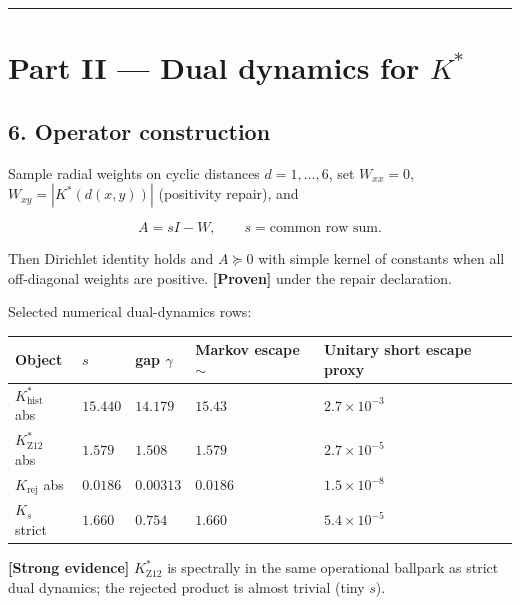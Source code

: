 \documentclass[11pt,a4paper,openany]{report}
\newcommand{\statusProven}{\textcolor{fingreen}{[Proven]}}
\newcommand{\statusStrong}{\textcolor{finblue}{[Strong evidence]}}
\begin{document}
\par\medskip\hrule\medskip

\chapter{\texorpdfstring{Part II — Dual dynamics for \(K^*\)}{Part II — Dual dynamics for K\textasciicircum{}*}}

\section{6. Operator construction}

Sample radial weights on cyclic distances \(d=1,\ldots,6\), set \(W_{xx}=0\), \(W_{xy}=|K^*(d(x,y))|\) (positivity repair), and

\[
A=sI-W,\qquad s=\text{common row sum}.
\]

Then Dirichlet identity holds and \(A\succeq 0\) with simple kernel of constants when all off-diagonal weights are positive. \textbf{\statusProven{}} under the repair declaration.

Selected numerical dual-dynamics rows:

\begin{center}
\begingroup\footnotesize
\setlength{\tabcolsep}{3.5pt}
\renewcommand{\arraystretch}{1.16}
\begin{longtable}{@{}p{}p{}p{}p{}p{}@{}}
\toprule
\textbf{Object} & \textbf{\(s\)} & \textbf{gap \(\gamma\)} & \textbf{Markov escape \(\sim\)} & \textbf{Unitary short escape proxy} \\
\midrule
\endhead
\(K^*_{\mathrm{hist}}\) abs & \(15.440\) & \(14.179\) & \(15.43\) & \(2.7\times10^{-3}\) \\
\(K^*_{\mathrm{Z12}}\) abs & \(1.579\) & \(1.508\) & \(1.579\) & \(2.7\times10^{-5}\) \\
\(K_{\mathrm{rej}}\) abs & \(0.0186\) & \(0.00313\) & \(0.0186\) & \(1.5\times10^{-8}\) \\
\(K_s\) strict & \(1.660\) & \(0.754\) & \(1.660\) & \(5.4\times10^{-5}\) \\
\bottomrule
\end{longtable}
\endgroup
\end{center}

\textbf{\statusStrong{}} \(K^*_{\mathrm{Z12}}\) is spectrally in the same operational ballpark as strict dual dynamics; the rejected product is almost trivial (tiny \(s\)).
\end{document}
